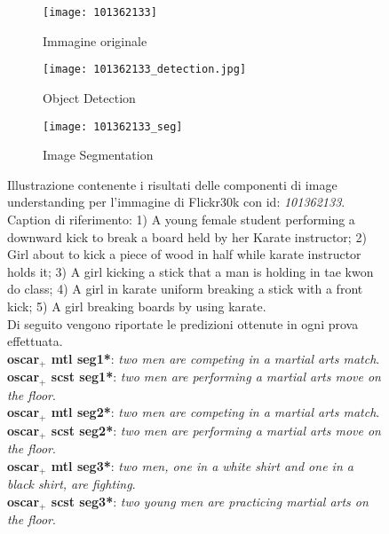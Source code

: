 \begin{figure}[H]
     \centering
     \begin{subfigure}[b]{0.32\textwidth}
         \centering
         \texttt{[image: 101362133]}
         \caption{Immagine originale}
     \end{subfigure}
     \begin{subfigure}[b]{0.32\textwidth}
         \centering
         \texttt{[image: 101362133\_detection.jpg]}
         \caption{Object Detection}
     \end{subfigure}
     \begin{subfigure}[b]{0.32\textwidth}
         \centering
         \texttt{[image: 101362133\_seg]}
         \caption{Image Segmentation}
     \end{subfigure}
     \captionsetup{singlelinecheck=off}
        \caption{Illustrazione contenente i risultati delle componenti di image understanding per l'immagine di Flickr30k con id: \textit{101362133}.
        Caption di riferimento: 1) A young female student performing a downward kick to break a board held by her Karate instructor; 2) Girl about to kick a piece of wood in half while karate instructor holds it; 3) A girl kicking a stick that a man is holding in tae kwon do class; 4) A girl in karate uniform breaking a stick with a front kick; 5) A girl breaking boards by using karate.\\
        Di seguito vengono riportate le predizioni ottenute in ogni prova effettuata.\\
        \textbf{\acrshort{oscar}$_+$ \acrshort{mtl} seg1*}: \textit{two men are competing in a martial arts match}.\\
        \textbf{\acrshort{oscar}$_+$ \acrshort{scst} seg1*}: \textit{two men are performing a martial arts move on the floor}.\\
        \textbf{\acrshort{oscar}$_+$ \acrshort{mtl} seg2*}: \textit{two men are competing in a martial arts match}.\\
        \textbf{\acrshort{oscar}$_+$ \acrshort{scst} seg2*}: \textit{two men are performing a martial arts move on the floor}.\\
        \textbf{\acrshort{oscar}$_+$ \acrshort{mtl} seg3*}: \textit{two men, one in a white shirt and one in a black shirt, are fighting}.\\
        \textbf{\acrshort{oscar}$_+$ \acrshort{scst} seg3*}: \textit{two young men are practicing martial arts on the floor}.\\
}
\end{figure}
